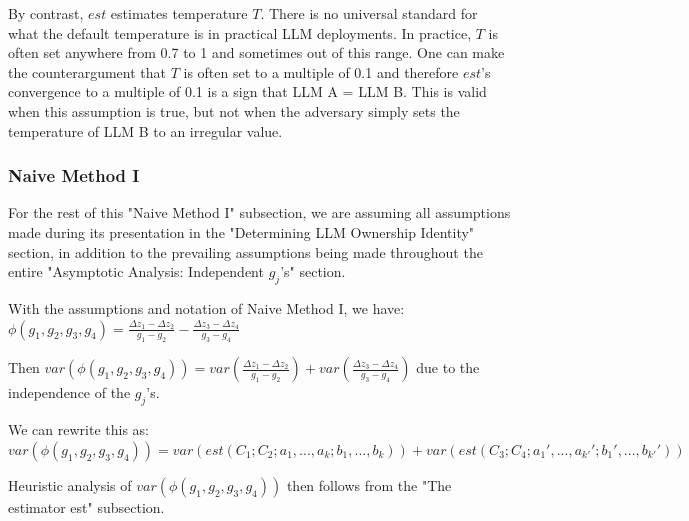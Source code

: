 \documentclass{article}
\begin{document}
By contrast, $\displaystyle est$ estimates temperature $\displaystyle T$. There is no universal standard for what the default temperature is in practical LLM deployments. In practice, $\displaystyle T$ is often set anywhere from 0.7 to 1 and sometimes out of this range. One can make the counterargument that $\displaystyle T$ is often set to a multiple of 0.1 and therefore $\displaystyle est$'s convergence to a multiple of 0.1 is a sign that LLM A = LLM B. This is valid when this assumption is true, but not when the adversary simply sets the temperature of LLM B to an irregular value.



\subsubsection{Naive Method I}
\begin{mdframed}
    For the rest of this "Naive Method I" subsection, we are assuming all assumptions made during its presentation in the "Determining LLM Ownership Identity" section, in addition to the prevailing assumptions being made throughout the entire "Asymptotic Analysis: Independent $\displaystyle g_{j}$'s" section.
\end{mdframed}

With the assumptions and notation of Naive Method I, we have: $\displaystyle \phi \left( g_{1} ,g_{2} ,g_{3} ,g_{4}\right) =\frac{\Delta z_{1} -\Delta z_{2}}{g_{1} -g_{2}} -\frac{\Delta z_{3} -\Delta z_{4}}{g_{3} -g_{4}}$

Then $\displaystyle var\left( \phi \left( g_{1} ,g_{2} ,g_{3} ,g_{4}\right)\right) =var\left(\frac{\Delta z_{1} -\Delta z_{2}}{g_{1} -g_{2}}\right) +var\left(\frac{\Delta z_{3} -\Delta z_{4}}{g_{3} -g_{4}}\right)$ due to the independence of the $\displaystyle g_{j}$'s.



We can rewrite this as: $\displaystyle var\left( \phi \left( g_{1} ,g_{2} ,g_{3} ,g_{4}\right)\right) =var\left( est\left( C_{1} ;C_{2} ;a_{1} ,...,a_{k} ;b_{1} ,...,b_{k}\right)\right) +var\left( est\left( C_{3} ;C_{4} ;a_{1} ',...,a_{k'} ';b_{1} ',...,b_{k'} '\right)\right)$



Heuristic analysis of $\displaystyle var\left( \phi \left( g_{1} ,g_{2} ,g_{3} ,g_{4}\right)\right)$ then follows from the "The estimator est" subsection.
\end{document}

